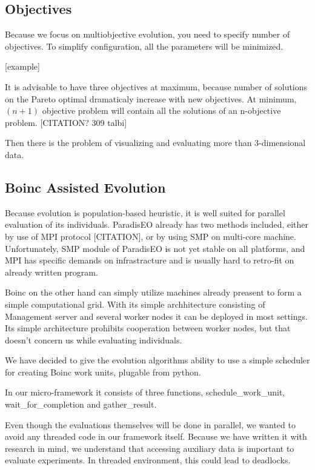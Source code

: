 \documentclass[12pt,oneside,draft]{fithesis2}
\begin{document}
\subsection{Objectives}

Because we focus on multiobjective evolution, you need to specify number of objectives. To simplify configuration, all the parameters will be minimized.

[example]

It is advisable to have three objectives at maximum, because number of solutions on the Pareto optimal dramaticaly increase with new objectives.
At minimum, $(n+1)$ objective problem will contain all the solutions of an n-objective problem. [CITATION? 309 talbi]

Then there is the problem of visualizing and evaluating more than 3-dimensional data.

\subsection{Boinc Assisted Evolution}

Because evolution is population-based heuristic, it is well suited for parallel evaluation of its individuals. ParadisEO already has two methods included, either by use of MPI protocol [CITATION], or by using SMP on multi-core machine. Unfortunately, SMP module of ParadisEO is not yet stable on all platforms, and MPI has specific demands on infrastracture and is usually hard to retro-fit on already written program. 

Boinc on the other hand  can simply utilize machines already preasent to form a simple computational grid. With its simple archhitecture consisting of Management server and several worker nodes it can be deployed in most settings. Its simple architecture prohibits cooperation between worker nodes, but that doesn't concern us while evaluating individuals.

We have decided to give the evolution algorithms ability to use a simple scheduler for creating Boinc work units, plugable from python.

In our micro-framework it consists of three functions, schedule\_work\_unit, wait\_for\_completion and gather\_result.

Even though the evaluations themselves will be done in parallel, we wanted to avoid any threaded code in our framework itself. Because we have written it with research in mind, we understand that accessing auxiliary data is important to evaluate experiments. In threaded environment, this could lead to deadlocks.
\end{document}
